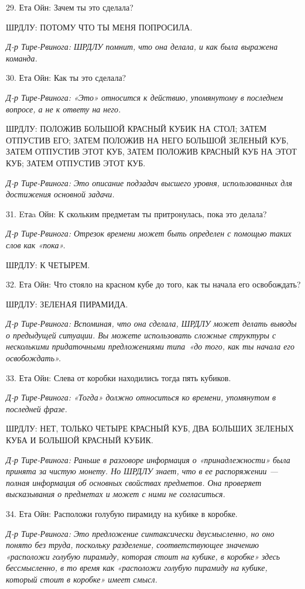 29. Ета Ойн: Зачем ты это сделала?

ШРДЛУ: ПОТОМУ ЧТО ТЫ МЕНЯ ПОПРОСИЛА.

\emph{Д-р Тире-Рвинога: ШРДЛУ помнит, что она делала, и как была выражена команда.}

30. Ета Ойн: Как ты это сделала?

\emph{Д-р Тире-Рвинога: «Это» относится к действию, упомянутому в последнем вопросе, а не к ответу на него.}

ШРДЛУ: ПОЛОЖИВ БОЛЬШОЙ КРАСНЫЙ КУБИК НА СТОЛ; ЗАТЕМ ОТПУСТИВ ЕГО; ЗАТЕМ ПОЛОЖИВ НА НЕГО БОЛЬШОЙ ЗЕЛЕНЫЙ КУБ, ЗАТЕМ ОТПУСТИВ ЭТОТ КУБ, ЗАТЕМ ПОЛОЖИВ КРАСНЫЙ КУБ НА ЭТОТ КУБ; ЗАТЕМ ОТПУСТИВ ЭТОТ КУБ.

\emph{Д-р Тире-Рвинога: Это описание подзадач высшего уровня, использованных для достижения основной задачи.}

31. Eтаa Ойн: К скольким предметам ты притронулась, пока это делала?

\emph{Д-р Тире-Рвинога: Отрезок времени может быть определен с помощью таких слов как «пока».}

ШРДЛУ: К ЧЕТЫРЕМ.

32. Ета Ойн: Что стояло на красном кубе до того, как ты начала его освобождать?

ШРДЛУ: ЗЕЛЕНАЯ ПИРАМИДА.

\emph{Д-р Тире-Рвинога: Вспоминая, что она сделала, ШРДЛУ может делать выводы о предыдущей ситуации. Вы можете использовать сложные структуры с несколькими придаточными предложениями типа~«до того, как ты начала его освобождать».}

33. Ета Ойн: Слева от коробки находились тогда пять кубиков.

\emph{Д-р Тире-Рвинога: «Тогда» должно относиться ко времени, упомянутом в последней фразе.}

ШРДЛУ: НЕТ, ТОЛЬКО ЧЕТЫРЕ КРАСНЫЙ КУБ, ДВА БОЛЬШИХ ЗЕЛЕНЫХ КУБА И БОЛЬШОЙ КРАСНЫЙ КУБИК.

\emph{Д-р Тире-Рвинога: Раньше в разговоре информация о «принадлежности» была принята за чистую монету. Но ШРДЛУ знает, что в ее распоряжении --- полная информация об основных свойствах предметов. Она проверяет высказывания о предметах и может с ними не согласиться.}

34. Ета Ойн: Расположи голубую пирамиду на кубике в коробке.

\emph{Д-р Тире-Рвинога: Это предложение синтаксически двусмысленно, но оно понято без труда, поскольку разделение, соответствующее значению «расположи голубую пирамиду, которая стоит на кубике, в коробке» здесь бессмысленно, в то время как «расположи голубую пирамиду на кубике, который стоит в коробке» имеет смысл.}


